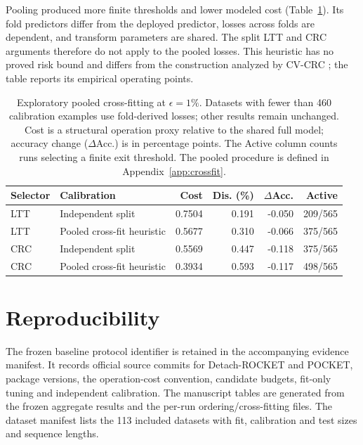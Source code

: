\documentclass[pdflatex,sn-basic,Numbered]{sn-jnl}
\begin{document}
Pooling produced more finite thresholds and lower modeled cost (Table~\ref{tab:crossfit}). Its fold predictors differ from the deployed predictor, losses across folds are dependent, and transform parameters are shared. The split LTT and CRC arguments therefore do not apply to the pooled losses. This heuristic has no proved risk bound and differs from the construction analyzed by CV-CRC \cite{cvcrc}; the table reports its empirical operating points.

\begin{table}[htbp]
\centering\small
\caption{Exploratory pooled cross-fitting at $\epsilon=1\%$. Datasets with fewer than 460 calibration examples use fold-derived losses; other results remain unchanged. Cost is a structural operation proxy relative to the shared full model; accuracy change ($\Delta$Acc.) is in percentage points. The Active column counts runs selecting a finite exit threshold. The pooled procedure is defined in Appendix~\ref{app:crossfit}.}\label{tab:crossfit}
\setlength{\tabcolsep}{4pt}
\begin{tabular}{|l|l|r|r|r|r|}
\hline\hline
\textbf{Selector} & \textbf{Calibration} & \textbf{Cost} & \textbf{Dis. (\%)} & \textbf{$\Delta$Acc.} & \textbf{Active} \\
\hline
LTT & Independent split & 0.7504 & 0.191 & -0.050 & 209/565 \\
\hline
LTT & Pooled cross-fit heuristic & 0.5677 & 0.310 & -0.066 & 375/565 \\
\hline
CRC & Independent split & 0.5569 & 0.447 & -0.118 & 375/565 \\
\hline
CRC & Pooled cross-fit heuristic & 0.3934 & 0.593 & -0.117 & 498/565 \\
\hline
\hline\hline
\end{tabular}
\end{table}

\section{Reproducibility}\label{app:repro}
The frozen baseline protocol identifier is retained in the accompanying evidence manifest. It records official source commits for Detach-ROCKET and POCKET, package versions, the operation-cost convention, candidate budgets, fit-only tuning and independent calibration. The manuscript tables are generated from the frozen aggregate results and the per-run ordering/cross-fitting files. The dataset manifest lists the 113 included datasets with fit, calibration and test sizes and sequence lengths.




\end{document}
